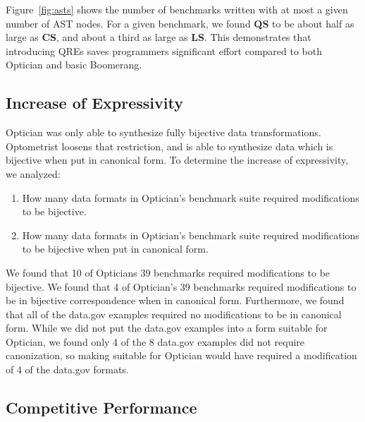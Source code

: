 \documentclass[acmsmall,review,anonymous]{acmart}\settopmatter{printfolios=true,printccs=false,printacmref=false}
\newcommand{\Name}{Optometrist}
\newcommand{\QRESize}{\textbf{QS}}
\newcommand{\CanonizerAndSpecSize}{\textbf{CS}}
\newcommand{\LensAndSpecSize}{\textbf{LS}}
\begin{document}
Figure~\ref{fig:asts} shows the number of benchmarks written with at most a
given number of AST nodes. For a given benchmark, we found \QRESize{} to be
about half as large as \CanonizerAndSpecSize, and about a third as large as
\LensAndSpecSize{}. This demonstrates that introducing QREs saves programmers
significant effort compared to both Optician and basic Boomerang.

\subsection{Increase of Expressivity}

Optician was only able to synthesize fully bijective data transformations.
\Name{} loosens that restriction, and is able to synthesize data which is
bijective when put in canonical form.
To determine the increase of expressivity, we analyzed:
\begin{enumerate}
  \item How many data formats in Optician's benchmark suite required modifications
  to be bijective.
  \item How many data formats in Optician's benchmark suite required modifications
  to be bijective when put in canonical form.
\end{enumerate}

We found that 10 of Opticians 39 benchmarks required modifications to be
bijective. We found that 4 of Optician's 39
benchmarks required modifications to be in bijective correspondence when in
canonical form.  Furthermore, we found that all of the data.gov examples
required no modifications to be in canonical form.  While we did not put the
data.gov examples into a form suitable for Optician, we found only 4 of
the 8 data.gov examples did not require canonization, so making suitable
for Optician would have required a modification of 4 of the data.gov
formats.

\subsection{Competitive Performance}
\end{document}
